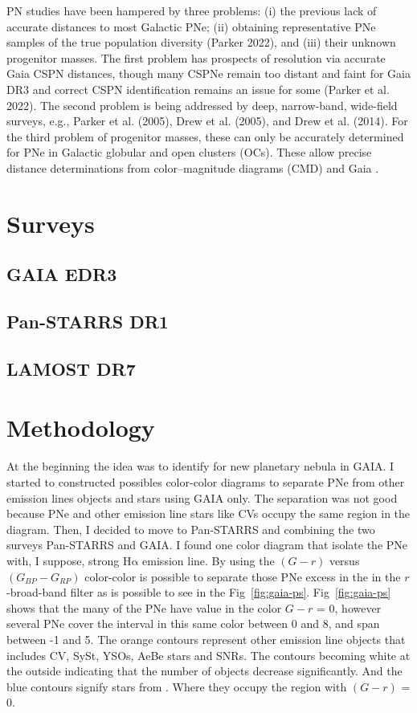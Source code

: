 \documentclass[twocolumn]{article}
\newcommand\ha{\ensuremath{\mathrm{H\alpha}}}
\begin{document}
PN studies have been hampered by three problems:
(i) the previous lack of accurate distances to most Galactic
PNe; (ii) obtaining representative PNe samples of the true
population diversity (Parker 2022), and (iii) their unknown
progenitor masses. The first problem has prospects of
resolution via accurate Gaia CSPN distances, though many
CSPNe remain too distant and faint for Gaia DR3 and correct
CSPN identification remains an issue for some (Parker et al.
2022). The second problem is being addressed by deep, narrow-band,
wide-field surveys, e.g., Parker et al. (2005),
Drew et al. (2005), and Drew et al. (2014). For the third problem
of progenitor masses, these can only
be accurately determined for PNe in Galactic globular and
open clusters (OCs). These allow precise distance determinations
from color–magnitude diagrams (CMD) and Gaia \citep{Fragkou:2022}.

\section{Surveys}
\label{sec:surveys}

\subsection{GAIA EDR3}
\label{sec:gaia}

\subsection{Pan-STARRS DR1}
\label{sec:PS1}

\subsection{LAMOST DR7}
\label{sec:lamost}

\section{Methodology}
\label{sec:metho}

At the beginning the idea was to identify for new planetary nebula in GAIA.
I started to constructed possibles color-color diagrams to separate PNe from
other emission lines objects and stars using GAIA only. The separation was not
good because PNe and other emission line stars like CVs occupy the same region
in the diagram. Then, I decided to move to Pan-STARRS and combining the two
surveys Pan-STARRS and GAIA. I found one color diagram that isolate the PNe
with, I suppose, strong \ha{} emission line. By using the \((G - r)\) versus \((G_{BP} - G_{RP})\)
color-color is possible to separate those PNe excess in the in the $r$-broad-band
filter as is possible to see in the Fig~\ref{fig:gaia-ps}. Fig~\ref{fig:gaia-ps}
shows that the many of the PNe have value in the color \(G - r\) = 0, however several
PNe cover the interval in this same color between 0 and 8, and span between -1 and 5.
The orange contours represent other emission line objects that includes CV, SySt,
YSOs, AeBe stars and SNRs. The contours becoming white at the outside indicating
that the number of objects decrease significantly. And the blue contours signify
stars from \citet{Smart:2021}. Where they occupy the region with \((G - r)\) = 0.
\end{document}
